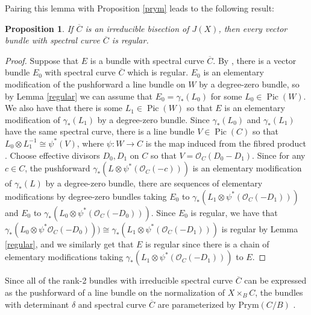\documentclass{article}[12pt]
\newtheorem{proposition}[theorem]{Proposition}
\theoremstyle{definition}
\theoremstyle{remark}
\numberwithin{equation}{section}
\newcommand \mc{\mathcal}
\DeclareMathOperator{\Pic}{Pic}
\begin{document}
Pairing this lemma with Proposition \ref{prym} leads to the following result:
\begin{proposition}\label{irred}
	If $\overline{C}$ is an irreducible bisection of $J(X)$, then every vector bundle with spectral curve $\overline{C}$ is regular.
\end{proposition}
\begin{proof}
	Suppose that $E$ is a bundle with spectral curve $\overline{C}$. By \cite[Theorem 4.1]{BrMoFM}, there is a vector bundle $E_0$ with spectral curve $\overline{C}$ which is regular. $E_0$ is an elementary modification of the pushforward a line bundle on $W$ by a degree-zero bundle, so by Lemma \ref{regular} we can assume that $E_0=\gamma_*(L_0)$ for some $L_0 \in \Pic(W)$. We also have that there is some $L_1 \in \Pic(W)$ so that $E$ is an elementary modification of $\gamma_*(L_1)$ by a degree-zero bundle. Since $\gamma_*(L_0)$ and $\gamma_*(L_1)$ have the same spectral curve, there is a line bundle $V \in \Pic(C)$ so that $L_0\otimes L_1^{-1}\cong \psi^{*}(V)$, where $\psi:W\to C$ is the map induced from the fibred product \cite[Theorem 4.5]{BrMoFM}. Choose effective divisors $D_0,D_1$ on $C$ so that $V=\mc{O}_C(D_0-D_1)$. Since for any $c \in C$, the pushforward $\gamma_*(L\otimes \psi^*(\mc{O}_C(-c)))$ is an elementary modification of $\gamma_*(L)$ by a degree-zero bundle, there are sequences of elementary modifications by degree-zero bundles taking $E_0$ to $\gamma_*(L_1\otimes \psi^*(\mc{O}_C(-D_1)))$ and $E_0$ to $\gamma_*(L_0\otimes \psi^*(\mc{O}_C(-D_0)))$. Since $E_0$ is regular, we have that $\gamma_*(L_0\otimes \psi^*\mc{O}_C(-D_0)))\cong \gamma_*(L_1\otimes \psi^*(\mc{O}_C(-D_1)))$ is regular by Lemma \ref{regular}, and we similarly get that $E$ is regular since there is a chain of elementary modifications taking $\gamma_*(L_1\otimes \psi^*(\mc{O}_C(-D_1)))$ to $E$. 
\end{proof}

Since all of the rank-2 bundles with irreducible spectral curve $\overline{C}$ can be expressed as the pushforward of a line bundle on the normalization of $X\times_B C$, the bundles with determinant $\delta$ and spectral curve $\overline{C}$ are parameterized by $\text{Prym}(C/B)$ \cite[Theorem 4.5]{BrMoFM}. 
\end{document}
